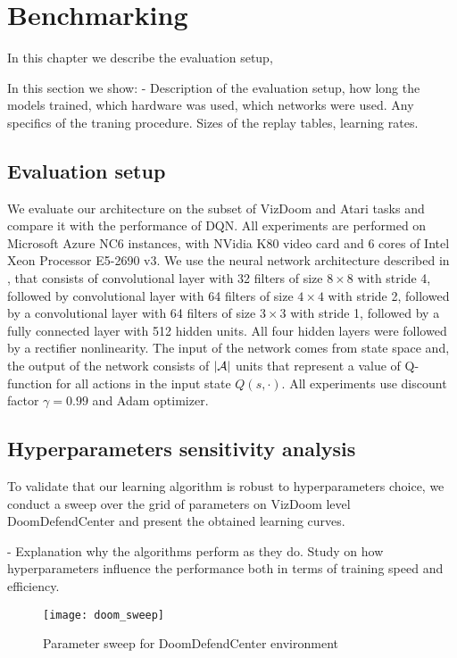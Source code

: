 \section{Benchmarking}

In this chapter we describe the evaluation setup, 

In this section we show:
- Description of the evaluation setup, how long the models trained, which hardware was used,
which networks were used. Any specifics of the traning procedure. Sizes of the replay tables,
learning rates.

\subsection{Evaluation setup}

We evaluate our architecture on the subset of VizDoom and Atari tasks and compare it with the
performance of DQN. All experiments are performed on Microsoft Azure NC6 instances, with NVidia K80
video card and 6 cores of Intel Xeon Processor E5-2690 v3. We use the neural network architecture
described in \cite{NatureDQN}, that consists of convolutional layer with 32 filters of size $8
\times 8$ with stride 4, followed by convolutional layer with 64 filters of size $4 \times 4$ with
stride 2, followed by a convolutional layer with 64 filters of size $3 \times 3$ with stride 1,
followed by a fully connected layer with 512 hidden units. All four hidden layers were followed by
a rectifier nonlinearity. The input of the network comes from state space and,
the output of the network consists of $\left | \mathcal{A} \right |$ units that represent a value of Q-function
for all actions in the input state $Q(s, \cdot)$.
All experiments use discount factor $\gamma = 0.99$ and Adam optimizer.

\subsection{Hyperparameters sensitivity analysis}

To validate that our learning algorithm is robust to hyperparameters choice, we conduct a sweep
over the grid of parameters on VizDoom level DoomDefendCenter and present the obtained learning
curves.

- Explanation why the algorithms perform as they do. Study on how hyperparameters influence
the performance both in terms of training speed and efficiency.

\begin{figure}[h!]
\caption{Parameter sweep for DoomDefendCenter environment}
\texttt{[image: doom\_sweep]}
\end{figure}

